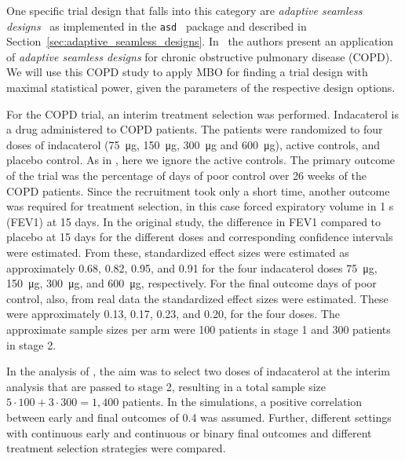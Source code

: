 \documentclass[bimj,fleqn]{w-art}
\theoremstyle{plain}
\theoremstyle{definition}
\begin{document}
One specific trial design that falls into this category are \emph{adaptive seamless designs}~\citep{barnes_integrating_2010} as implemented in the \texttt{asd}~\cite{parsons_software_2011} package and described in Section~\ref{sec:adaptive_seamless_designs}.
In~\citet{friede_adaptive_2020} the authors present an application of \emph{adaptive seamless designs} for chronic obstructive pulmonary disease (COPD).
We will use this COPD study to apply MBO for finding a trial design with maximal statistical power, given the parameters of the respective design options.


For the COPD trial, an interim treatment selection was performed. 
Indacaterol is a drug administered to COPD patients.
The patients were randomized to four doses of indacaterol (\SI{75}{\micro\gram}, \SI{150}{\micro\gram}, \SI{300}{\micro\gram} and \SI{600}{\micro\gram}), active controls, and placebo control.
As in \citet{friede_adaptive_2020}, here we ignore the active controls.
The primary outcome of the trial was the percentage of days of poor control over 26 weeks of the COPD patients.
Since the recruitment took only a short time, another outcome was required for treatment selection, in this case forced expiratory volume in 1 s (FEV1) at 15 days.
In the original study, the difference in FEV1 compared to placebo at 15 days for the different doses and corresponding confidence intervals were estimated.
From these, standardized effect sizes were estimated as approximately 0.68, 0.82, 0.95, and 0.91 for the four  indacaterol doses \SI{75}{\micro\gram}, \SI{150}{\micro\gram}, \SI{300}{\micro\gram}, and \SI{600}{\micro\gram}, respectively.
For the final outcome days of poor control, also, from real data the standardized effect sizes were estimated.
These were approximately 0.13, 0.17, 0.23, and 0.20, for the four doses.
The approximate sample sizes per arm were 100 patients in stage 1 and 300 patients in stage 2.

In the analysis of \citet{friede_adaptive_2020}, the aim was to select two doses of indacaterol at the interim analysis that are passed to stage 2, resulting in a total sample size $5 \cdot 100 + 3 \cdot 300 = 1,400$ patients. 
In the simulations, a positive correlation between early and final outcomes of 0.4 was assumed.
Further, different settings with continuous early and continuous or binary final outcomes and different treatment selection strategies were compared.
\end{document}
